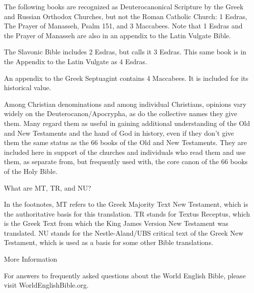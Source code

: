 {\par }{\IP The following books are recognized as Deuterocanonical Scripture by the Greek and Russian Orthodox Churches, but not the Roman Catholic Church: 1 Esdras, The Prayer of Manasseh, Psalm 151, and 3 Maccabees. Note that 1 Esdras and the Prayer of Manasseh are also in an appendix to the Latin Vulgate Bible.
\par }{\IP The Slavonic Bible includes 2 Esdras, but calls it 3 Esdras. This same book is in the Appendix to the Latin Vulgate as 4 Esdras.
\par }{\IP An appendix to the Greek Septuagint contains 4 Maccabees. It is included for its historical value.
\par }{\IP Among Christian denominations and among individual Christians, opinions vary widely on the Deuterocanon/Apocrypha, as do the collective names they give them. Many regard them as useful in gaining additional understanding of the Old and New Testaments and the hand of God in history, even if they don’t give them the same status as the 66 books of the Old and New Testaments. They are included here in support of the churches and individuals who read them and use them, as separate from, but frequently used with, the core canon of the 66 books of the Holy Bible.
\par }{\IS What are MT, TR, and NU?
\par }{\IP In the footnotes, MT refers to the Greek Majority Text New Testament, which is the authoritative basis for this translation. TR stands for Textus Receptus, which is the Greek Text from which the King James Version New Testament was translated. NU stands for the Nestle-Aland/UBS critical text of the Greek New Testament, which is used as a basis for some other Bible translations.
\par }{\IS More Information
\par }{\IP For answers to frequently asked questions about the World English Bible, please visit WorldEnglishBible.org.

\par }